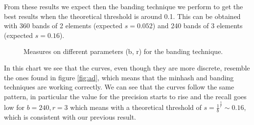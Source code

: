 \documentclass[a4paper, 11pt]{article} %
\begin{document}
From these results we expect then the banding technique we perform to get the best results when the theoretical threshold is around 0.1. This can be obtained with 360 bands of 2 elements (expected $s=0.052$) and 240 bands of 3 elements (expected $s=0.16$).\\ 
\begin{figure}[H]
\centering
\noindent{}
\caption{Measures on different parameters (b, r) for the banding technique.}
\label{fig:c}
\end{figure}
In this chart we see that the curves, even though they are more discrete, resemble the ones found in figure \ref{fig:ad}, which means that the minhash and banding techniques are working correctly. We can see that the curves follow the same pattern, in particular the value for the precision starts to rise and the recall goes low for $b=240, r=3$ which means with a theoretical threshold of $s=\frac{1}{b}^{\frac{1}{r}} \sim 0.16$, which is consistent with our previous result.
\end{document}
